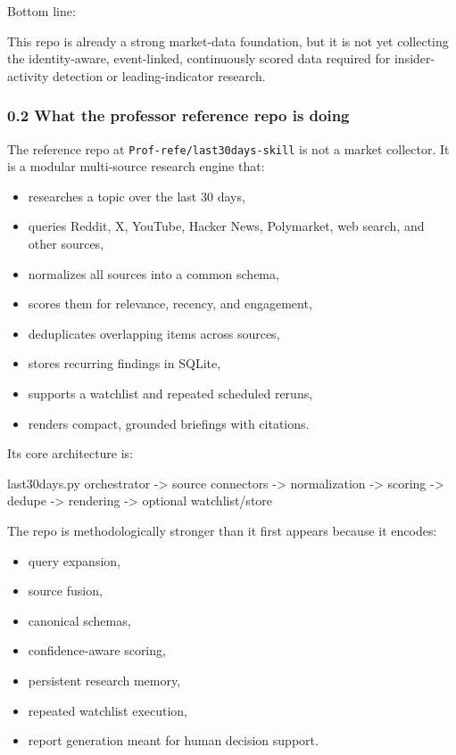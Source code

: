 \documentclass[
]{article}
\newenvironment{Shaded}{}{}
\newcommand{\NormalTok}[1]{#1}
\providecommand{\tightlist}{%
  \setlength{\itemsep}{0pt}\setlength{\parskip}{0pt}}
\begin{document}
Bottom line:

This repo is already a strong market-data foundation, but it is not yet
collecting the identity-aware, event-linked, continuously scored data
required for insider-activity detection or leading-indicator research.

\subsubsection{0.2 What the professor reference repo is
doing}\label{02-what-the-professor-reference-repo-is-doing}

The reference repo at \texttt{Prof-refe/last30days-skill} is not a
market collector. It is a modular multi-source research engine that:

\begin{itemize}
\tightlist
\item
  researches a topic over the last 30 days,
\item
  queries Reddit, X, YouTube, Hacker News, Polymarket, web search, and
  other sources,
\item
  normalizes all sources into a common schema,
\item
  scores them for relevance, recency, and engagement,
\item
  deduplicates overlapping items across sources,
\item
  stores recurring findings in SQLite,
\item
  supports a watchlist and repeated scheduled reruns,
\item
  renders compact, grounded briefings with citations.
\end{itemize}

Its core architecture is:

\begin{Shaded}
\begin{Highlighting}[]
\NormalTok{last30days.py orchestrator}
\NormalTok{  {-}\textgreater{} source connectors}
\NormalTok{  {-}\textgreater{} normalization}
\NormalTok{  {-}\textgreater{} scoring}
\NormalTok{  {-}\textgreater{} dedupe}
\NormalTok{  {-}\textgreater{} rendering}
\NormalTok{  {-}\textgreater{} optional watchlist/store}
\end{Highlighting}
\end{Shaded}

The repo is methodologically stronger than it first appears because it
encodes:

\begin{itemize}
\tightlist
\item
  query expansion,
\item
  source fusion,
\item
  canonical schemas,
\item
  confidence-aware scoring,
\item
  persistent research memory,
\item
  repeated watchlist execution,
\item
  report generation meant for human decision support.
\end{itemize}
\end{document}
